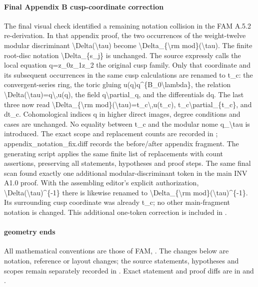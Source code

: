 \documentclass[11pt,a4paper]{article}
\theoremstyle{plain}
\theoremstyle{definition}
\begin{document}
\paragraph{Final Appendix B cusp-coordinate correction}
The final visual check identified a remaining notation collision in the FAM A.5.2 re-derivation. In that appendix proof, the two occurrences of the weight-twelve modular discriminant \textbackslash{}Delta(\textbackslash{}tau) become \textbackslash{}Delta\_\allowbreak{}\{\textbackslash{}rm mod\}(\textbackslash{}tau). The finite root-disc notation \textbackslash{}Delta\_\allowbreak{}\{s\_\allowbreak{}j\} is unchanged.
The source expressly calls the local equation q=z\_\allowbreak{}0z\_\allowbreak{}1z\_\allowbreak{}2 the original cusp family. Only that coordinate and its subsequent occurrences in the same cusp calculations are renamed to t\_\allowbreak{}c:\allowbreak{} the convergent-series ring, the toric gluing u(q)q\textasciicircum{}\{B\_\allowbreak{}0\textbackslash{}lambda\}, the relation \textbackslash{}Delta(\textbackslash{}tau)=q\textbackslash{},u(q), the field q\textbackslash{}partial\_\allowbreak{}q, and the differentials dq. The last three now read \textbackslash{}Delta\_\allowbreak{}\{\textbackslash{}rm mod\}(\textbackslash{}tau)=t\_\allowbreak{}c\textbackslash{},u(t\_\allowbreak{}c), t\_\allowbreak{}c\textbackslash{}partial\_\allowbreak{}\{t\_\allowbreak{}c\}, and dt\_\allowbreak{}c. Cohomological indices q in higher direct images, degree conditions and cases are unchanged. No equality between t\_\allowbreak{}c and the modular nome q\_\allowbreak{}\textbackslash{}tau is introduced.
The exact scope and replacement counts are recorded in ; appendix\_\allowbreak{}notation\_\allowbreak{}fix.diff records the before/\allowbreak{}after appendix fragment. The generating script applies the same finite list of replacements with count assertions, preserving all statements, hypotheses and proof steps.
The same final scan found exactly one additional modular-discriminant token in the main INV A1.0 proof. With the assembling editor's explicit authorization, \textbackslash{}Delta(\textbackslash{}tau)\textasciicircum{}\{-1\} there is likewise renamed to \textbackslash{}Delta\_\allowbreak{}\{\textbackslash{}rm mod\}(\textbackslash{}tau)\textasciicircum{}\{-1\}. Its surrounding cusp coordinate was already t\_\allowbreak{}c; no other main-fragment notation is changed. This additional one-token correction is included in .
\paragraph{geometry ends}
All mathematical conventions are those of FAM, . The changes below are notation, reference or layout changes; the source statements, hypotheses and scopes remain separately recorded in . Exact statement and proof diffs are in  and .
\end{document}
